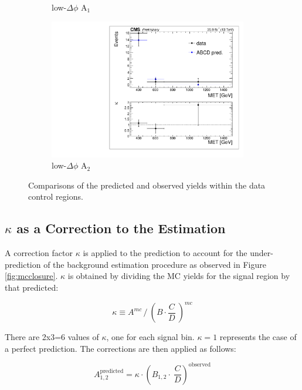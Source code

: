 \begin{figure}[hb!]
\begin{subfigure}[b]{0.42\textwidth}
\caption{low-$\Delta\phi$ A$_{1}$}
\end{subfigure}
\begin{subfigure}[b]{0.42\textwidth}
\centering
\includegraphics[trim={5px 5px 5px 5px},clip,width=0.95\textwidth]{figs/dataClosure_double-tagSR_lowDphi.pdf} 
\caption{low-$\Delta\phi$ A$_{2}$}
\end{subfigure}
\caption{Comparisons of the predicted and observed yields within the data control regions.}
\label{fig:closure}
\end{figure}

\subsection{$\kappa$ as a Correction to the Estimation}
\label{sec:kappa}

A correction factor $\kappa$ is applied to the prediction to account for the under-prediction of the background estimation procedure as observed in Figure \ref{fig:mcclosure}. $\kappa$ is obtained by dividing the MC yields for the signal region by that predicted:

\begin{equation}
\kappa  \equiv A^{mc} \,/  \ \left(B \cdot \frac{C} {D} \ \right)^{mc}
\label{eq:kappa}
\end{equation}

There are 2x3=6 values of $\kappa$, one for each signal bin. $\kappa=1$ represents the case of a perfect prediction. The corrections are then applied as follows:

\begin{equation}
A_{1, 2}^{\mathrm{predicted}} = \kappa \cdot \left(B_{1, 2} \cdot \ \frac{C}{D}\right)^{\textrm{observed}}
\end{equation}

